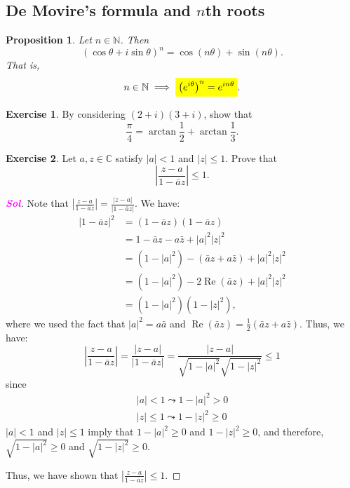 \documentclass[12pt,openany]{book}
\newcommand{\mathcolorbox}[2]{\colorbox{#1}{$\displaystyle #2$}}
\newtheorem{proposition}[theorem]{Proposition}
\theoremstyle{definition}
\newtheorem{exercise}{Exercise}[section]
\newcommand{\N}{\mathbb{N}}
\newcommand{\C}{\mathbb{C}}
\newcommand{\of}[1]{\left( #1 \right)}
\newcommand{\abs}[1]{\left\lvert #1 \right\rvert}
\newcommand{\sol}{\textcolor{magenta}{\bf Sol}}
\renewcommand{\Re}{\operatorname{Re}}
\begin{document}
	\subsection{De Movire's formula and $n$th roots}
	\begin{tcolorbox}[title=De Moivre's Formula]
		\begin{proposition}
			Let $n\in\N$. Then \[
			\of{\cos\theta+i\sin\theta}^n=\cos(n\theta)+\sin(n\theta).
			\]  That is, \[
			n\in\N\implies \mathcolorbox{-blue}{\of{e^{i\theta}}^n=e^{in\theta}}.
			\]
		\end{proposition}
	\end{tcolorbox}
	
	\begin{exercise}
		By considering $(2+i)(3+i)$, show that \[
		\frac{\pi}{4}=\arctan\frac{1}{2}+\arctan\frac{1}{3}.
		\]
	\end{exercise}
	
	\begin{exercise}
		Let $a,z\in\C$ satisfy $\abs{a}<1$ and $\abs{z}\leq 1$. Prove that \[
		\abs{\frac{z-a}{1-\bar{a}z}}\leq 1.
		\] \begin{proof}[\sol]
			Note that $\abs{\frac{z-a}{1-\bar{a}z}} = \frac{\abs{z-a}}{\abs{1-\bar{a}z}}$. We have:
			\begin{align*}
			\abs{1-\bar{a}z}^2 &= (1-\bar{a}z)(1-\bar{a}z) \\
			&= 1 - \bar{a}z - a\bar{z} + \abs{a}^2 \abs{z}^2 \\
			&= (1-\abs{a}^2) - (\bar{a}z + a\bar{z}) + \abs{a}^2 \abs{z}^2 \\
			&= (1-\abs{a}^2) - 2\Re(\bar{a}z) + \abs{a}^2 \abs{z}^2 \\
			&= (1-\abs{a}^2)(1-\abs{z}^2),
			\end{align*} where we used the fact that $\abs{a}^2 = a\bar{a}$ and $\Re(\bar{a}z) = \frac{1}{2}(\bar{a}z + a\bar{z})$. Thus, we have:
			$$\abs{\frac{z-a}{1-\bar{a}z}} = \frac{\abs{z-a}}{\abs{1-\bar{a}z}} = \frac{\abs{z-a}}{\sqrt{1-\abs{a}^2}\sqrt{1-\abs{z}^2}} \leq 1$$
			since \begin{align*}
			\abs{a}<1\leadsto 1-\abs{a}^2> 0 \\
			\abs{z}\leq 1\leadsto 1-\abs{z}^2\geq 0
			\end{align*}$\abs{a}<1$ and $\abs{z}\leq 1$ imply that $1-\abs{a}^2\geq 0$ and $1-\abs{z}^2\geq 0$, and therefore, $\sqrt{1-\abs{a}^2}\geq 0$ and $\sqrt{1-\abs{z}^2}\geq 0$.
			
			Thus, we have shown that $\abs{\frac{z-a}{1-\bar{a}z}}\leq 1$.
		\end{proof}
	\end{exercise}
	
\end{document}
